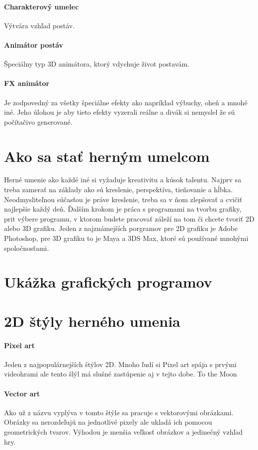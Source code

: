 \documentclass[10pt,twoside,slovak,a4paper]{article}
\begin{document}
\paragraph{Charakterový umelec} Výtvára vzhľad postáv.
\paragraph{Animátor postáv} Špeciálny typ 3D animátora, ktorý vdychuje život postavám.
\paragraph{FX animátor}Je zodpovedný za všetky špeciálne efekty ako napríklad výbuchy, oheň a mnohé iné. Jeho úlohou je aby tieto efekty vyzerali reálne a divák si nemyslel že sú počítačivo generované.

\section{Ako sa stať herným umelcom}
Herné umenie ako každé iné si vyžaduje kreativitu a kúsok talentu. Najprv sa treba zamerať na základy ako sú kreslenie, perspektíva, tieňovanie a hĺbka. Neodmysliteľnou súčasťou je práve kreslenie, treba sa v ňom zlepšovať a cvičiť najlepšie každý deň. Ďalším krokom je práca s programami na tvorbu grafiky, prit výbere programu, v ktorom budete pracovať záleží na tom či chcete tvoriť 2D alebo 3D grafiku. Jeden z najznámejších porgramov pre 2D grafiku je Adobe Photoshop, pre 3D grafiku to je Maya a 3DS Max, ktoré sú používané mnohými spoločnosťami.
\section{Ukážka grafických programov}


\cite{8944678}


\section{2D štýly herného umenia}
\paragraph{Pixel art}
Jeden z najpopulárnejších štýlov 2D. Mnoho ľudí si Pixel art spája s prvými videohrami ale tento šlýl má slušné zastúpenie aj v tejto dobe. 
To the Moon


\paragraph{Vector art}
Ako už z názvu vyplýva v tomto štýle sa pracuje s vektorovými obrázkami. Obrázky sa nerozdeľujú na jednotlivé pixely ale ukladá ich pomocou geometrických tvarov. Výhodou je menšia veľkosť obrázkov a jedinečný vzhľad hry.
\end{document}
